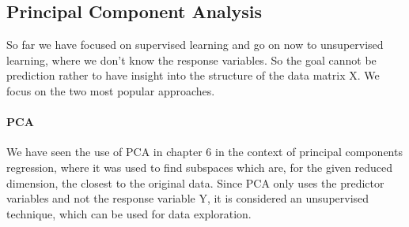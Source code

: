 \documentclass[../document.tex]{subfiles}
\begin{document}
	\subsection{Principal Component Analysis}
	So far we have focused on supervised learning and go on now to unsupervised learning, where we don't know the response variables. So the goal cannot be prediction rather to have insight into the structure of the data matrix X. We focus on the two most popular approaches.

	\paragraph{PCA}
	We have seen the use of PCA in chapter 6 in the context of principal components regression, where it was used to find subspaces which are, for the given reduced dimension, the closest to the original data. Since PCA only uses the predictor variables and not the response variable Y, it is considered an unsupervised technique, which can be used for data exploration.
\end{document}
